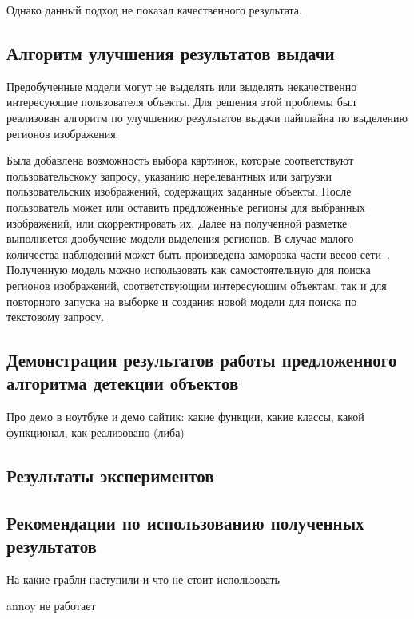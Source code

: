 \documentclass[a4paper,14pt]{article}
\begin{document}
    Однако данный подход не показал качественного результата.
    
    \subsection{Алгоритм улучшения результатов выдачи}
    
    Предобученные модели могут не выделять или выделять некачественно интересующие пользователя объекты.
    Для решения этой проблемы был реализован алгоритм по улучшению результатов выдачи пайплайна по выделению регионов изображения.
    
    Была добавлена возможность выбора картинок, которые соответствуют пользовательскому запросу, указанию нерелевантных или загрузки пользовательских изображений, содержащих заданные объекты.
    После пользователь может или оставить предложенные регионы для выбранных изображений, или скорректировать их.
    Далее на полученной разметке выполняется дообучение модели выделения регионов.
    В случае малого количества наблюдений может быть произведена заморозка части весов сети~\cite{wang2020few}.
    Полученную модель можно использовать как самостоятельную для поиска регионов изображений, соответствующим интересующим объектам, так и для повторного запуска на выборке и создания новой модели для поиска по текстовому запросу.
    
    \subsection{Демонстрация результатов работы предложенного алгоритма детекции объектов}
    
    Про демо в ноутбуке и демо сайтик: какие функции, какие классы, какой функционал, как реализовано (либа)
    
    \subsection{Результаты экспериментов}
    
    \subsection{Рекомендации по использованию полученных результатов}
    
    На какие грабли наступили и что не стоит использовать
    
    annoy не работает
    
\end{document}
